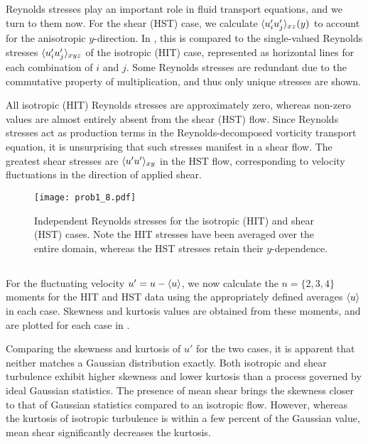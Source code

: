 \documentclass[11pt]{article}
\begin{document}
\subsection{}

Reynolds stresses play an important role in fluid transport equations, and we turn to them now. For the shear (HST) case, we calculate $\langle u_i' u_j' \rangle_{xz}(y)$ to account for the anisotropic $y$-direction. In , this is compared to the single-valued Reynolds stresses $\langle u_i' u_j' \rangle_{xyz}$ of the isotropic (HIT) case, represented as horizontal lines for each combination of $i$ and $j$. Some Reynolds stresses are redundant due to the commutative property of multiplication, and thus only unique stresses are shown.

All isotropic (HIT) Reynolds stresses are approximately zero, whereas non-zero values are almost entirely absent from the shear (HST) flow. Since Reynolds stresses act as production terms in the Reynolds-decomposed vorticity transport equation, it is unsurprising that such stresses manifest in a shear flow. The greatest shear stresses are $\langle u'u' \rangle_{xy}$ in the HST flow, corresponding to velocity fluctuations in the direction of applied shear.

\begin{figure}[t]
\centering
\texttt{[image: prob1\_8.pdf]}
\\[6pt]
\caption{Independent Reynolds stresses for the isotropic (HIT) and shear (HST) cases. Note the HIT stresses have been averaged over the entire domain, whereas the HST stresses retain their $y$-dependence.}
\label{fig:prob_1_8_reynolds_stresses}
\end{figure}

\subsection{}

For the fluctuating velocity $u' = u - \langle u \rangle$, we now calculate the $n=\{2,3,4\}$ moments for the HIT and HST data using the appropriately defined averages $\left< u \right>$ in each case. Skewness and kurtosis values are obtained from these moments, and are plotted for each case in .

Comparing the skewness and kurtosis of $u'$ for the two cases, it is apparent that neither matches a Gaussian distribution exactly. Both isotropic and shear turbulence exhibit higher skewness and lower kurtosis than a process governed by ideal Gaussian statistics. The presence of mean shear brings the skewness closer to that of Gaussian statistics compared to an isotropic flow. However, whereas the kurtosis of isotropic turbulence is within a few percent of the Gaussian value, mean shear significantly decreases the kurtosis.
\end{document}
